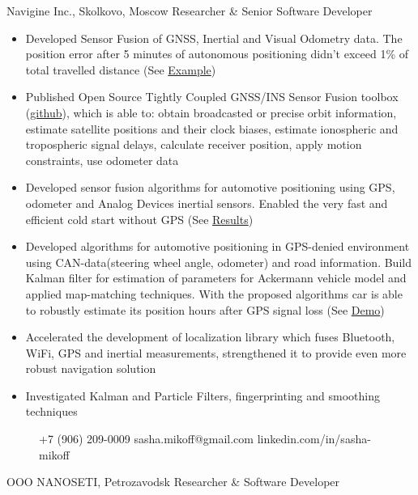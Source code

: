\documentclass{tccv}
\begin{document}
\begin{eventlist}
     {\textcolor{blue(ncs)}{N}avigine Inc., Skolkovo, Moscow}
     {Researcher \& Senior Software Developer}
\begin{itemize}
    \item Developed Sensor Fusion of GNSS, Inertial and Visual Odometry data. The position error after 5 minutes of autonomous positioning didn't exceed 1\% of total travelled distance (See  \href{https://www.dropbox.com/s/kaij23xphdqjv5j/kalman_heading_correction_on.html?dl=1}{Example})
    \item Published Open Source Tightly Coupled GNSS/INS Sensor Fusion toolbox (\href{https://github.com/Navigine/Navbox}{github}), which is able to: obtain broadcasted or precise orbit information, estimate satellite positions and their clock biases, estimate ionospheric and tropospheric signal delays, calculate receiver position, apply motion constraints, use odometer data
    \item Developed sensor fusion algorithms for automotive positioning using GPS, odometer and Analog Devices inertial sensors. Enabled the very fast and efficient cold start without GPS (See \href{https://www.dropbox.com/s/yjag8qm7ax6skoa/vehicle_positioning_demo.pptx}{Results})
    \item Developed algorithms for automotive positioning in GPS-denied environment using CAN-data(steering wheel angle, odometer) and road information. Build Kalman filter for estimation of parameters for Ackermann vehicle model and applied map-matching techniques. With the proposed algorithms car is able to robustly estimate its position hours after GPS signal loss (See \href{https://www.dropbox.com/s/awil97l95az982h/AutotomotiveCanFusion.png}{Demo})
    \item Accelerated the development of localization library  which fuses Bluetooth, WiFi, GPS and inertial measurements, strengthened it to provide even more robust navigation solution
    \item Investigated Kalman and Particle Filters, fingerprinting and smoothing techniques
\end{itemize}

\begin{figure}[t]
    {+7 (906) 209-0009}
    {sasha.mikoff@gmail.com}
    {linkedin.com/in/sasha-mikoff}
    {}
\end{figure}

     {OOO NANOSETI, Petrozavodsk}
     {Researcher \& Software Developer}
     

\end{eventlist}
\end{document}
